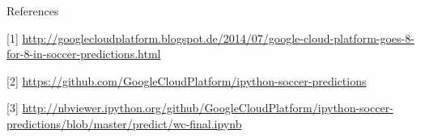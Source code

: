 \documentclass[12pt,fleqn]{article}\usepackage{../common}
\begin{document}
References

[1] \url{http://googlecloudplatform.blogspot.de/2014/07/google-cloud-platform-goes-8-for-8-in-soccer-predictions.html}

[2] \url{https://github.com/GoogleCloudPlatform/ipython-soccer-predictions}

[3] \url{http://nbviewer.ipython.org/github/GoogleCloudPlatform/ipython-soccer-predictions/blob/master/predict/wc-final.ipynb}
\end{document}
